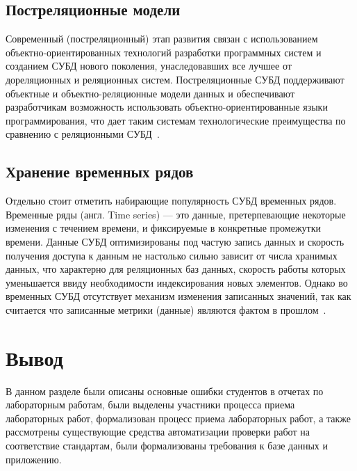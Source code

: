 \subsection{Постреляционные модели}
Современный (постреляционный) этап развития связан с использованием объектно-ориентированных технологий разработки программных систем и созданием СУБД нового поколения, унаследовавших все лучшее от дореляционных и реляционных систем. Постреляционные СУБД поддерживают 
объектные и объектно-реляционные модели данных и обеспечивают разработчикам возможность использовать объектно-ориентированные языки программирования, что дает таким системам технологические преимущества по сравнению с реляционными СУБД~\cite{wolf-db}.

\subsection{Хранение временных рядов}
Отдельно стоит отметить набирающие популярность СУБД временных рядов. Временные ряды (англ. Time series) --- это данные, 
претерпевающие некоторые изменения с течением 
времени, и фиксируемые в конкретные промежутки 
времени. Данные СУБД оптимизированы под частую запись данных и скорость получения доступа к данным не настолько сильно зависит от числа хранимых данных, что характерно для реляционных баз данных, скорость работы которых уменьшается ввиду необходимости индексирования новых элементов. Однако во временных СУБД отсутствует механизм изменения записанных значений, так как считается что записанные метрики (данные) являются фактом в прошлом~\cite{time_db}.

\section*{Вывод}
В данном разделе были описаны основные ошибки студентов в отчетах по лабораторным работам, были выделены участники процесса приема лабораторных работ, формализован процесс приема лабораторных работ, а также рассмотрены существующие средства автоматизации проверки работ на соответствие стандартам, были формализованы требования к базе данных и приложению. 

